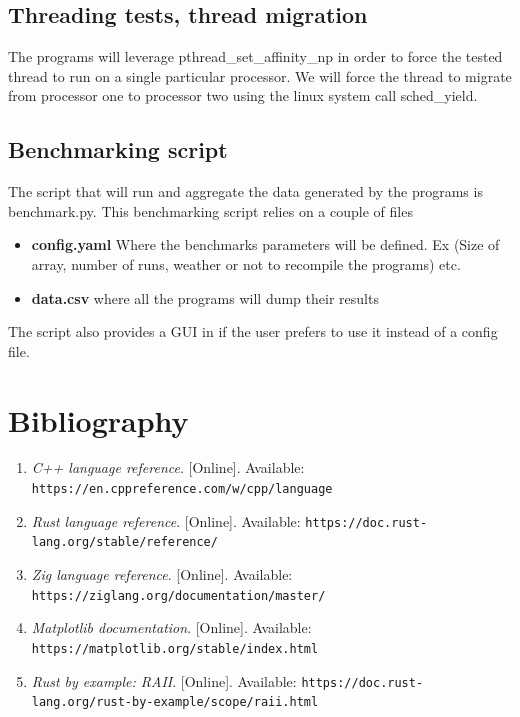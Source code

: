 \documentclass{article}
\begin{document}
\subsection{Threading tests, thread migration}
The programs will leverage pthread\_set\_affinity\_np in order to force the tested thread to run on a single particular processor. We will force the thread to migrate from processor one to processor two using the linux system call sched\_yield.

\subsection{Benchmarking script}
The script that will run and aggregate the data generated by the programs is benchmark.py. This benchmarking script relies on a couple of files 
\begin{itemize}
    \item \textbf{config.yaml} Where the benchmarks parameters will be defined. Ex (Size of array, number of runs, weather or not to recompile the programs) etc.
    \item \textbf{data.csv} where all the programs will dump their results
\end{itemize}
The script also provides a GUI in if the user prefers to use it instead of a config file.

\clearpage
\section{Bibliography}
\begin{enumerate}
    \item \textit{C++ language reference}. [Online]. Available: \texttt{https://en.cppreference.com/w/cpp/language}
    \item \textit{Rust language reference}. [Online]. Available: \texttt{https://doc.rust-lang.org/stable/reference/}
    \item \textit{Zig language reference}. [Online]. Available: \texttt{https://ziglang.org/documentation/master/}
    \item \textit{Matplotlib documentation}. [Online]. Available: \texttt{https://matplotlib.org/stable/index.html}
    \item \textit{Rust by example: RAII}. [Online]. Available: \texttt{https://doc.rust-lang.org/rust-by-example/scope/raii.html}
\end{enumerate}
\end{document}

